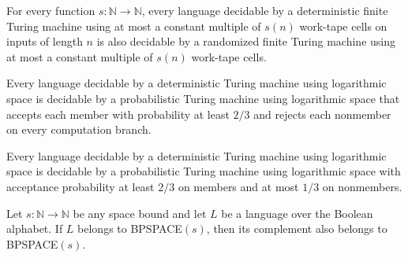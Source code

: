 \begin{theorem}
\label{Randomized.SPACE_subset_RSPACE}
\leanok
{}
For every function $s:\mathbb{N}\to\mathbb{N}$, every language decidable by a
deterministic finite Turing machine using at most a constant multiple of $s(n)$
work-tape cells on inputs of length $n$ is also decidable by a randomized finite Turing
machine using at most a constant multiple of $s(n)$ work-tape cells.
\end{theorem}

\begin{theorem}
\label{Randomized.LOGSPACE_subset_RL}
\leanok
{}
Every language decidable by a deterministic Turing machine using logarithmic space is
decidable by a probabilistic Turing machine using logarithmic space that accepts each
member with probability at least $2/3$ and rejects each nonmember on every computation
branch.
\end{theorem}

\begin{theorem}
\label{Randomized.LOGSPACE_subset_BPL}
\leanok
{}
Every language decidable by a deterministic Turing machine using logarithmic space is
decidable by a probabilistic Turing machine using logarithmic space with acceptance
probability at least $2/3$ on members and at most $1/3$ on nonmembers.
\end{theorem}

\begin{theorem}
\label{Randomized.compl_mem_BPSPACE}
\leanok
{}
Let $s:\mathbb{N}\to\mathbb{N}$ be any space bound and let $L$ be a language over the
Boolean alphabet. If $L$ belongs to BPSPACE$(s)$, then its complement also belongs to
BPSPACE$(s)$.
\end{theorem}

